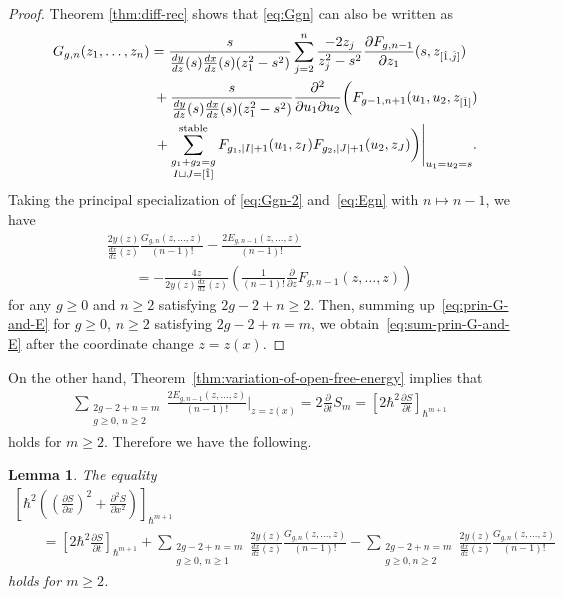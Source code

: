 \documentclass[pdftex]{sigma}
\newtheorem{lem}[thm]{Lemma}
\theoremstyle{definition}
\numberwithin{equation}{section}
\def\p{\partial}
\begin{document}
\begin{proof}
Theorem \ref{thm:diff-rec} shows that
\eqref{eq:Ggn} can also be written as
\begin{gather}
G_{g,n}(z_{1},\dots,z_{n}) =
\frac{s}{\frac{dy}{dz}(s) \frac{dx}{dz}(s)(z_{1}^{2}-s^{2})}
\sum_{j=2}^{n} \frac{-2 z_{j}}{z_{j}^{2}-s^{2}}
\frac{\p F_{g,n-1}}{\p z_{1}}(s,z_{[\hat{1}, \hat{j}]})\nonumber
\\
\hphantom{G_{g,n}(z_{1},\dots,z_{n}) =}{}
+ \frac{s}{\frac{dy}{dz}(s) \frac{dx}{dz}(s)(z_{1}^{2}-s^{2})}
\frac{\p^{2}}{\p u_{1} \p u_{2}}
\biggl( F_{g-1,n+1}(u_{1},u_{2},z_{[\hat{1}]}) \nonumber\\
\hphantom{G_{g,n}(z_{1},\dots,z_{n}) =}{}+
\sum_{\substack{g_{1}+g_{2}=g \\ I \sqcup J = [\hat{1}]}}^{\rm stable}
F_{g_{1}, |I|+1}(u_{1},z_{I}) F_{g_{2}, |J|+1}(u_{2}, z_{J})
\biggr)\Biggr|_{u_{1}=u_{2}=s}.\label{eq:Ggn-2}
\end{gather}
Taking the principal specialization of \eqref{eq:Ggn-2} and~\eqref{eq:Egn} with $n \mapsto n-1$, we have
\begin{gather}
\frac{2y(z)}{\frac{dx}{dz}(z)}
\frac{G_{g,n}(z,\dots,z)}{(n-1)!} -
\frac{2 E_{g,n-1}(z,\dots,z)}{(n-1)!} \nonumber\\
\qquad{} =
- \frac{4z}{2y(z)\frac{dx}{dz}(z)}
\left(\frac{1}{(n-1)!} \frac{\p}{\p z} F_{g,n-1}(z,\dots,z)\right)\label{eq:prin-G-and-E}
\end{gather}
for any $g \ge 0$ and $n \ge 2$ satisfying
$2g-2+n \ge 2$.
Then, summing up~\eqref{eq:prin-G-and-E}
for $g \ge 0$, $n \ge 2$ satisfying $2g-2+n = m$,
we obtain~\eqref{eq:sum-prin-G-and-E} after
the coordinate change $z = z(x)$.
\end{proof}

On the other hand, Theorem~\ref{thm:variation-of-open-free-energy} implies that
\begin{gather*} %
\sum_{\substack{2g-2+n=m \\ g \ge 0,\,  n\ge 2 }}
\frac{2E_{g,n-1}(z,\dots,z)}{(n-1)!} \Biggr|_{z=z(x)}
= 2\frac{\p}{\p t} S_{m}
= \left[ 2\hbar^{2} \frac{\p S}{\p t} \right]_{\hbar^{m+1}}
\end{gather*}
holds for $m \ge 2$.
Therefore we have the following.

\begin{lem} \label{lem:tderivative-and-partial-Riccati}
The equality
\begin{gather*}%
\left[ \hbar^{2}\left( \left(\frac{\p S}{\p x}\right)^{2} +
\frac{\p^{2} S}{\p x^{2}} \right)  \right]_{\hbar^{m+1}} \\
\qquad{} =
\left[ 2\hbar^{2} \frac{\p S}{\p t} \right]_{\hbar^{m+1}} + \sum_{\substack{2g-2+n=m \\ g \ge 0,\, n\ge {1} }}
\frac{2y(z)}{\frac{dx}{dz}(z)}
\frac{G_{g,n}(z,\dots,z)}{(n-1)!} -
\sum_{\substack{2g-2+n=m \\ g \ge 0, n\ge {2} }}
\frac{2y(z)}{\frac{dx}{dz}(z)}
\frac{G_{g,n}(z,\dots,z)}{(n-1)!}
\end{gather*}
holds for $m \ge 2$.
\end{lem}
\end{document}
